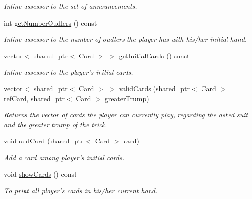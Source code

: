 \begin{DoxyCompactItemize}
\begin{DoxyCompactList}\small\item\em Inline assessor to the set of announcements. \end{DoxyCompactList}\item 
\hypertarget{classPlayer_a4dc51cf2a773556eb26f3d47c4274b0a}{int \hyperlink{classPlayer_a4dc51cf2a773556eb26f3d47c4274b0a}{get\-Number\-Oudlers} () const }\label{classPlayer_a4dc51cf2a773556eb26f3d47c4274b0a}

\begin{DoxyCompactList}\small\item\em Inline assessor to the number of oudlers the player has with his/her initial hand. \end{DoxyCompactList}\item 
\hypertarget{classPlayer_aab2cfa2ce2e7a3903ff99ac5c7ef8db6}{vector$<$ shared\-\_\-ptr$<$ \hyperlink{classCard}{Card} $>$ $>$ \hyperlink{classPlayer_aab2cfa2ce2e7a3903ff99ac5c7ef8db6}{get\-Initial\-Cards} () const }\label{classPlayer_aab2cfa2ce2e7a3903ff99ac5c7ef8db6}

\begin{DoxyCompactList}\small\item\em Inline assessor to the player's initial cards. \end{DoxyCompactList}\item 
vector$<$ shared\-\_\-ptr$<$ \hyperlink{classCard}{Card} $>$ $>$ \hyperlink{classPlayer_ab89873d894a8e4e7e67a16feba4bf116}{valid\-Cards} (shared\-\_\-ptr$<$ \hyperlink{classCard}{Card} $>$ ref\-Card, shared\-\_\-ptr$<$ \hyperlink{classCard}{Card} $>$ greater\-Trump)
\begin{DoxyCompactList}\small\item\em Returns the vector of cards the player can currently play, regarding the asked suit and the greater trump of the trick. \end{DoxyCompactList}\item 
void \hyperlink{classPlayer_a7c7b8325247c91ef255ca493de9f35eb}{add\-Card} (shared\-\_\-ptr$<$ \hyperlink{classCard}{Card} $>$ card)
\begin{DoxyCompactList}\small\item\em Add a card among player's initial cards. \end{DoxyCompactList}\item 
\hypertarget{classPlayer_a5216f487067dd79371af457f4b8f1769}{void \hyperlink{classPlayer_a5216f487067dd79371af457f4b8f1769}{show\-Cards} () const }\label{classPlayer_a5216f487067dd79371af457f4b8f1769}

\begin{DoxyCompactList}\small\item\em To print all player's cards in his/her current hand. \end{DoxyCompactList}\end{DoxyCompactItemize}
